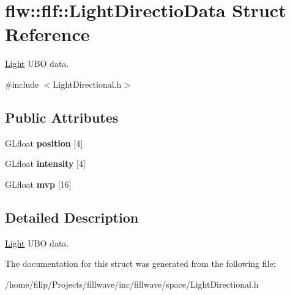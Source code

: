\hypertarget{structflw_1_1flf_1_1LightDirectioData}{}\section{flw\+:\+:flf\+:\+:Light\+Directio\+Data Struct Reference}
\label{structflw_1_1flf_1_1LightDirectioData}


\hyperlink{classflw_1_1flf_1_1Light}{Light} U\+BO data.  




{\ttfamily \#include $<$Light\+Directional.\+h$>$}

\subsection*{Public Attributes}
\begin{DoxyCompactItemize}
\item 
G\+Lfloat {\bfseries position} \mbox{[}4\mbox{]}\hypertarget{structflw_1_1flf_1_1LightDirectioData_ab93fd8912e661b05321da657edf5e2b8}{}\label{structflw_1_1flf_1_1LightDirectioData_ab93fd8912e661b05321da657edf5e2b8}

\item 
G\+Lfloat {\bfseries intensity} \mbox{[}4\mbox{]}\hypertarget{structflw_1_1flf_1_1LightDirectioData_ad3d310df515162775577c730388ae561}{}\label{structflw_1_1flf_1_1LightDirectioData_ad3d310df515162775577c730388ae561}

\item 
G\+Lfloat {\bfseries mvp} \mbox{[}16\mbox{]}\hypertarget{structflw_1_1flf_1_1LightDirectioData_ad0792b0c7715fa130dfa0aecfed8b5db}{}\label{structflw_1_1flf_1_1LightDirectioData_ad0792b0c7715fa130dfa0aecfed8b5db}

\end{DoxyCompactItemize}


\subsection{Detailed Description}
\hyperlink{classflw_1_1flf_1_1Light}{Light} U\+BO data. 

The documentation for this struct was generated from the following file\+:\begin{DoxyCompactItemize}
\item 
/home/filip/\+Projects/fillwave/inc/fillwave/space/Light\+Directional.\+h\end{DoxyCompactItemize}
